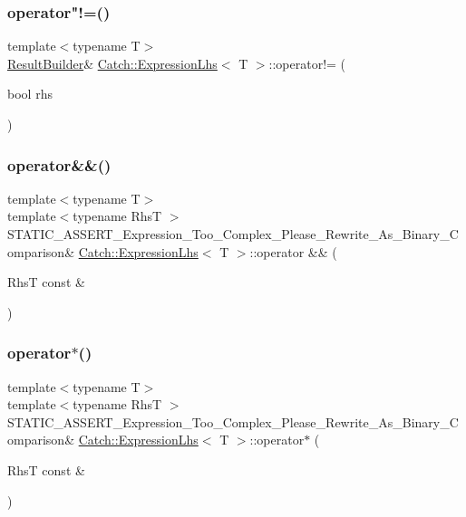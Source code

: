 \subsubsection{\texorpdfstring{operator"!=()}{operator!=()}\hspace{0.1cm}{\footnotesize\ttfamily [2/2]}}
{\footnotesize\ttfamily template$<$typename T$>$ \\
\hyperlink{class_catch_1_1_result_builder}{Result\+Builder}\& \hyperlink{class_catch_1_1_expression_lhs}{Catch\+::\+Expression\+Lhs}$<$ T $>$\+::operator!= (\begin{DoxyParamCaption}\item[{bool}]{rhs }\end{DoxyParamCaption})\hspace{0.3cm}{\ttfamily [inline]}}

\hypertarget{class_catch_1_1_expression_lhs_acbda1f937f8bd5b9da649626cc0b0f54}{}\label{class_catch_1_1_expression_lhs_acbda1f937f8bd5b9da649626cc0b0f54} 
\subsubsection{\texorpdfstring{operator\&\&()}{operator\&\&()}}
{\footnotesize\ttfamily template$<$typename T$>$ \\
template$<$typename RhsT $>$ \\
S\+T\+A\+T\+I\+C\+\_\+\+A\+S\+S\+E\+R\+T\+\_\+\+Expression\+\_\+\+Too\+\_\+\+Complex\+\_\+\+Please\+\_\+\+Rewrite\+\_\+\+As\+\_\+\+Binary\+\_\+\+Comparison\& \hyperlink{class_catch_1_1_expression_lhs}{Catch\+::\+Expression\+Lhs}$<$ T $>$\+::operator \&\& (\begin{DoxyParamCaption}\item[{RhsT const \&}]{ }\end{DoxyParamCaption})}

\hypertarget{class_catch_1_1_expression_lhs_a9a94294c22449f62087862ef911e6291}{}\label{class_catch_1_1_expression_lhs_a9a94294c22449f62087862ef911e6291} 
\subsubsection{\texorpdfstring{operator$\ast$()}{operator*()}}
{\footnotesize\ttfamily template$<$typename T$>$ \\
template$<$typename RhsT $>$ \\
S\+T\+A\+T\+I\+C\+\_\+\+A\+S\+S\+E\+R\+T\+\_\+\+Expression\+\_\+\+Too\+\_\+\+Complex\+\_\+\+Please\+\_\+\+Rewrite\+\_\+\+As\+\_\+\+Binary\+\_\+\+Comparison\& \hyperlink{class_catch_1_1_expression_lhs}{Catch\+::\+Expression\+Lhs}$<$ T $>$\+::operator$\ast$ (\begin{DoxyParamCaption}\item[{RhsT const \&}]{ }\end{DoxyParamCaption})}

